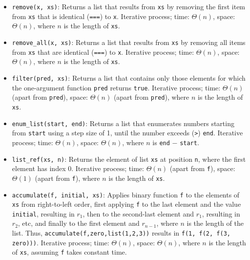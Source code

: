 \begin{itemize}
\item \lstinline{remove(x, xs)}: Returns a list that results from
\lstinline{xs} by removing the first item from \lstinline{xs} that
is identical (\lstinline{===}) to \lstinline{x}. Iterative process;
time: $\Theta(n)$, space: $\Theta(n)$, where $n$ is the length of \lstinline{xs}.
\item \lstinline{remove_all(x, xs)}: Returns a list that results from
\lstinline{xs} by removing all items from \lstinline{xs} that
are identical (\lstinline{===}) to \lstinline{x}.
Iterative process;
time: $\Theta(n)$, space: $\Theta(n)$, where $n$ is the length of \lstinline{xs}.
\item \lstinline{filter(pred, xs)}: Returns a list that contains
only those elements for which the one-argument function
\lstinline{pred}
returns \lstinline{true}.
Iterative process;
time: $\Theta(n)$ (apart from \lstinline{pred}), space: $\Theta(n)$ (apart from \lstinline{pred}), where $n$ is the length of \lstinline{xs}.
\item \lstinline{enum_list(start, end)}: Returns a list that enumerates
numbers starting from \lstinline{start} using a step size of 1, until
the number exceeds (\lstinline{>}) \lstinline{end}.
Iterative process;
time: $\Theta(n)$, space: $\Theta(n)$, where $n$ is \lstinline{end} $-$  \lstinline{start}.
\item \lstinline{list_ref(xs, n)}: Returns the element
of list \lstinline{xs} at position \lstinline{n}, 
where the first element has index 0.
Iterative process;
time: $\Theta(n)$ (apart from \lstinline{f}), space: $\Theta(1)$ (apart from \lstinline{f}), where $n$ is the length of \lstinline{xs}.
\item \lstinline{accumulate(f, initial, xs)}: Applies binary
function \lstinline{f} to the elements of \lstinline{xs} from
right-to-left order, first applying \lstinline{f} to the last element
and the value \lstinline{initial}, resulting in $r_1$, then to the 
second-last element and $r_1$, resulting in $r_2$, etc, and finally
to the first element and $r_{n-1}$, where $n$ is the length of the
list. Thus, \lstinline{accumulate(f,zero,list(1,2,3))} results in
\lstinline{f(1, f(2, f(3, zero)))}.
Iterative process;
time: $\Theta(n)$, space: $\Theta(n)$, where $n$ is the length of \lstinline{xs},
assuming \lstinline{f} takes constant time.
\end{itemize}
